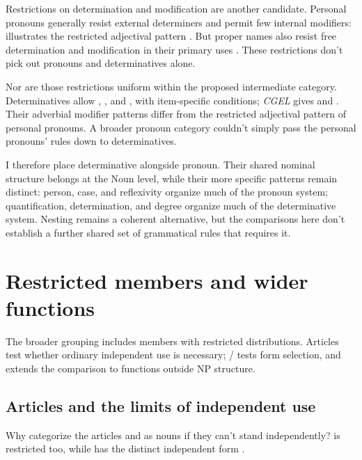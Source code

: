 \documentclass[12pt]{article}
\begin{document}
Restrictions on determination and modification are another candidate. Personal pronouns generally resist external determiners and permit few internal modifiers:  illustrates the restricted adjectival pattern \citep[429--430]{huddleston2002}. But proper names also resist free determination and modification in their primary uses \citep[517, 519--520]{huddleston2002}. These restrictions don't pick out pronouns and determinatives alone.

Nor are those restrictions uniform within the proposed intermediate category. Determinatives allow , , and , with item-specific conditions; \textit{CGEL} gives  and  \citep[415--416]{huddleston2002}. Their adverbial modifier patterns differ from the restricted adjectival pattern of personal pronouns. A broader pronoun category couldn't simply pass the personal pronouns' rules down to determinatives.

I therefore place determinative alongside pronoun. Their shared nominal structure belongs at the Noun level, while their more specific patterns remain distinct: person, case, and reflexivity organize much of the pronoun system; quantification, determination, and degree organize much of the determinative system. Nesting remains a coherent alternative, but the comparisons here don't establish a further shared set of grammatical rules that requires it.

\section{Restricted members and wider functions}\label{sec:articles}

The broader grouping includes members with restricted distributions. Articles test whether ordinary independent use is necessary; / tests form selection, and  extends the comparison to functions outside NP structure.

\subsection{Articles and the limits of independent use}

Why categorize the articles  and  as nouns if they can't stand independently?  is restricted too, while  has the distinct independent form  \citep[371--372, 410--411]{huddleston2002}.
\end{document}
